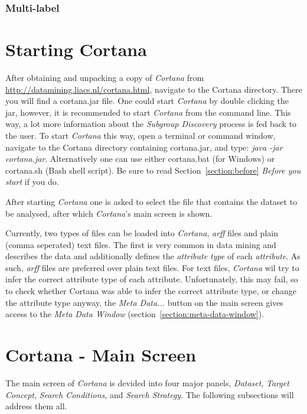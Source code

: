 \documentclass{article}
\begin{document}
\subsubsection{Multi-label}


\section{Starting Cortana}
After obtaining and unpacking a copy of \emph{Cortana} from \url{http://datamining.liacs.nl/cortana.html}, navigate to the Cortana directory.
There you will find a cortana.jar file.
One could start \emph{Cortana} by double clicking the jar, however, it is recommended to start \emph{Cortana} from the command line.
This way, a lot more information about the \emph{Subgroup Discovery} process is fed back to the user.
To start \emph{Cortana} this way, open a terminal or command window, navigate to the Cortana directory containing cortana.jar, and type: \emph{java -jar cortana.jar}.
Alternatively one can use either cortana.bat (for Windows) or cortana.sh (Bash shell script).
Be sure to read Section~\ref{section:before} \emph{Before you start} if you do.

After starting \emph{Cortana} one is asked to select the file that contains the dataset to be analysed, after which \emph{Cortana}'s main screen is shown.

Currently, two types of files can be loaded into \emph{Cortana}, \emph{arff} files and plain (comma seperated) text files.
The first is very common in data mining and describes the data and additionally defines the \emph{attribute type} of each \emph{attribute}.
As such, \emph{arff} files are preferred over plain text files.
For text files, \emph{Cortana} wil try to infer the correct attribute type of each attribute.
Unfortunately, this may fail, so to check whether Cortana was able to infer the correct attribute type, or change the attribute type anyway, the \emph{Meta Data...} button on the main screen gives access to the \emph{Meta Data Window} (section~\ref{section:meta-data-window}).





\section{Cortana - Main Screen}
\label{section:main}
The main screen of \emph{Cortana} is devided into four major panels, \emph{Dataset}, \emph{Target Concept}, \emph{Search Conditions}, and \emph{Search Strategy}.
The following subsections will address them all.
\end{document}
